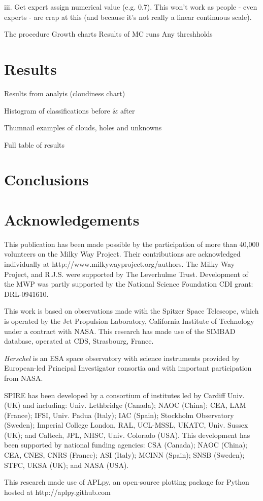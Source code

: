 \documentclass[a4,useAMS,usenatbib]{mn2e}
\begin{document}
		iii. Get expert assign numerical value (e.g. 0.7). This won't work as people - even experts - are crap at this (and because it's not really a linear continuous scale). 

The procedure
Growth charts
Results of MC runs
Any threshholds


\section{Results}
Results from analyis (cloudiness chart)

Histogram of classifications before \& after

Thumnail examples of clouds, holes and unknowns

Full table of results

\section{Conclusions}


\section{Acknowledgements}
This publication has been made possible by the participation of more than 40,000 volunteers on the Milky Way Project. Their contributions are acknowledged individually at http://www.milkywayproject.org/authors. The Milky Way Project, and R.J.S. were supported by The Leverhulme Trust. Development of the MWP was partly supported by the National Science Foundation CDI grant: DRL-0941610. 

This work is based on observations made with the Spitzer Space Telescope, which is operated by the Jet Propulsion Laboratory, California Institute of Technology under a contract with NASA. This research has made use of the SIMBAD database, operated at CDS, Strasbourg, France.

{\em Herschel} is an ESA space observatory with science instruments
provided by European-led Principal Investigator consortia and with important
participation from NASA.

SPIRE has been developed by a consortium of institutes led by Cardiff
Univ. (UK) and including: Univ. Lethbridge (Canada); NAOC (China);
CEA, LAM (France); IFSI, Univ. Padua (Italy); IAC (Spain); Stockholm
Observatory (Sweden); Imperial College London, RAL, UCL-MSSL, UKATC,
Univ. Sussex (UK); and Caltech, JPL, NHSC, Univ. Colorado (USA). This
development has been supported by national funding agencies: CSA
(Canada); NAOC (China); CEA, CNES, CNRS (France); ASI (Italy); MCINN
(Spain); SNSB (Sweden); STFC, UKSA (UK); and NASA (USA).

This research made use of APLpy, an open-source plotting package for
Python hosted at http://aplpy.github.com



\end{document}
